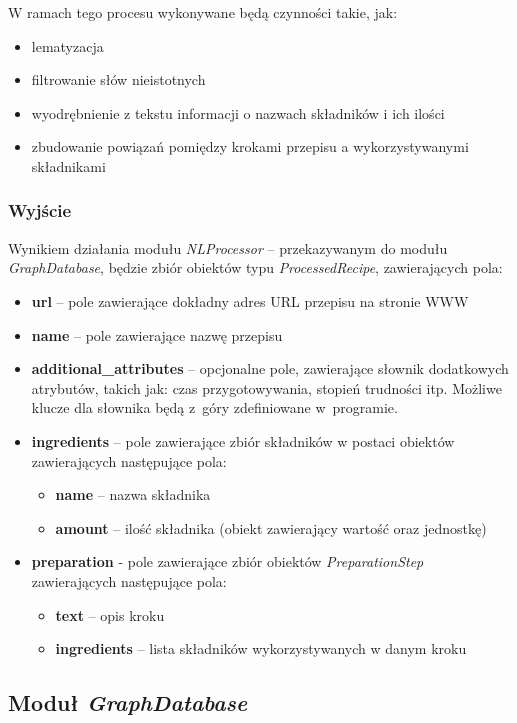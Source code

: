 \documentclass[11pt,a4paper]{article}
\begin{document}
W ramach tego procesu wykonywane będą czynności takie, jak:
\begin{itemize}
	\item lematyzacja 
	\item filtrowanie słów nieistotnych
	\item wyodrębnienie z tekstu informacji o nazwach składników i ich ilości
	\item zbudowanie powiązań pomiędzy krokami przepisu a wykorzystywanymi składnikami
\end{itemize}
\subsubsection{Wyjście}
Wynikiem działania modułu \textit{NLProcessor} -- przekazywanym do modułu \textit{GraphDatabase}, będzie zbiór obiektów typu \textit{ProcessedRecipe}, zawierających pola:
\begin{itemize}
  \item \textbf{url} -- pole zawierające dokładny adres URL przepisu na stronie WWW
  \item \textbf{name} -- pole zawierające nazwę przepisu
  \item \textbf{additional\_attributes} -- opcjonalne pole, zawierające słownik dodatkowych atrybutów, takich jak: czas przygotowywania, stopień trudności itp. Możliwe klucze dla słownika będą z~góry zdefiniowane w~programie.
  \item \textbf{ingredients} -- pole zawierające zbiór składników w postaci obiektów zawierających następujące pola:
  \begin{itemize}
    \item \textbf{name} -- nazwa składnika
    \item \textbf{amount} -- ilość składnika (obiekt zawierający wartość oraz jednostkę)
  \end{itemize}
  \item \textbf{preparation} - pole zawierające zbiór obiektów \textit{PreparationStep} zawierających następujące pola:
    \begin{itemize}
    \item \textbf{text} -- opis kroku
    \item \textbf{ingredients} -- lista składników wykorzystywanych w danym kroku
  \end{itemize}
\end{itemize}

\subsection{Moduł \textit{GraphDatabase}}
\end{document}
